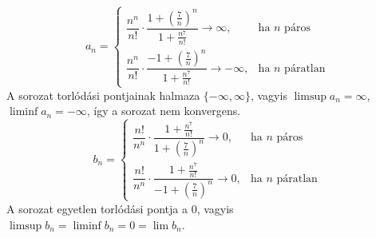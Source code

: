 \documentclass[11pt]{scrartcl}
\begin{document}
\[
	a_n = \begin{cases}
		\dfrac{n^n}{n!} \cdot \dfrac{1 + \left(\frac{7}{n}\right)^n}{1 + \frac{n^7}{n!}} \to \infty,
		 & \text{ha } n \text{ páros}     \\[3ex]
		\dfrac{n^n}{n!} \cdot \dfrac{-1 + \left(\frac{7}{n}\right)^n}{1 + \frac{n^7}{n!}} \to -\infty,
		 & \text{ha } n \text{ páratlan}
	\end{cases}
\]
A sorozat torlódási pontjainak halmaza $\{-\infty, \infty\}$,
vagyis $\limsup a_n = \infty$, $\liminf a_n = -\infty$, így a sorozat nem konvergens.
\[
	b_n = \begin{cases}
		\dfrac{n!}{n^n} \cdot \dfrac{1 + \frac{n^7}{n!}}{1 + \left(\frac{7}{n}\right)^n} \to 0,
		 & \text{ha } n \text{ páros}     \\[3ex]
		\dfrac{n!}{n^n} \cdot \dfrac{1 + \frac{n^7}{n!}}{-1 + \left(\frac{7}{n}\right)^n} \to 0,
		 & \text{ha } n \text{ páratlan}
	\end{cases}
\]
A sorozat egyetlen torlódási pontja a $0$, vagyis
$\limsup b_n = \liminf b_n = 0 = \lim b_n$.
\end{document}
